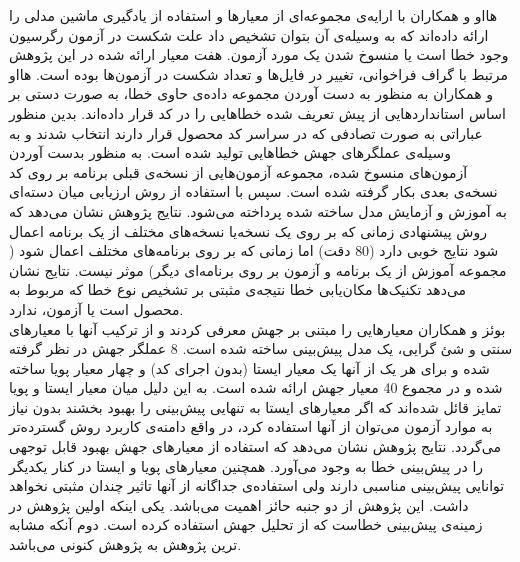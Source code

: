  هااو و همکاران با ارایه‌ی مجموعه‌ای از معیارها و استفاده از یادگیری ماشین مدلی را ارائه داده‌اند که به وسیله‌ی آن بتوان تشخیص داد علت شکست در آزمون رگرسیون وجود خطا است یا منسوخ  شدن یک مورد آزمون\cite{hao2013bug}. هفت معیار ارائه شده در این پژوهش مرتبط با گراف فراخوانی، تغییر در فایل‌ها و تعداد شکست در آزمون‌ها بوده است.  هااو و همکاران به منظور به دست آوردن مجموعه داده‌ی حاوی خطا، به صورت دستی بر اساس استانداردهایی  از پیش تعریف شده خطاهایی را در کد قرار داده‌اند. بدین منظور عباراتی به صورت تصادفی که در سراسر کد محصول قرار دارند انتخاب شدند و به وسیله‌ی عملگرهای جهش خطاهایی تولید شده است. به منظور بدست آوردن آزمون‌های منسوخ شده، مجموعه آزمون‌هایی از نسخه‌ی قبلی برنامه بر روی کد  نسخه‌ی بعدی بکار گرفته شده است. سپس با استفاده از روش ارزیابی میان دسته‌ای به آموزش و آزمایش مدل ساخته شده پرداخته می‌شود. نتایج پژوهش نشان می‌دهد که روش پیشنهادی زمانی که بر روی یک نسخه‌یا نسخه‌های مختلف از یک برنامه اعمال شود نتایج خوبی دارد (80\lr{\%} دقت) اما زمانی که بر روی برنامه‌های مختلف اعمال شود ( مجموعه آموزش از یک برنامه و آزمون بر روی برنامه‌ای دیگر) موثر نیست. نتایج نشان می‌دهد تکنیک‌ها مکان‌یابی خطا نتیجه‌ی مثبتی بر تشخیص نوع خطا که مربوط به محصول است یا آزمون، ندارد.\\
 
 بوئز و همکاران معیارهایی را مبتنی بر جهش معرفی کردند و  از ترکیب آنها با معیارهای سنتی و شئ گرایی، یک مدل پیش‌بینی ساخته شده است\cite{bowes2016mutation}. 8 عملگر جهش در نظر گرفته شده و برای هر یک از آنها یک معیار ایستا (بدون اجرای کد) و چهار معیار پویا ساخته شده و در مجموع 40 معیار جهش ارائه شده است. به این دلیل میان معیار ایستا و پویا تمایز قائل شده‌اند که اگر معیارهای ایستا به تنهایی  پیش‌بینی را بهبود بخشند بدون نیاز به موارد آزمون می‌توان از آنها استفاده کرد، در واقع دامنه‌ی کاربرد روش گسترده‌تر می‌گردد. نتایج پژوهش نشان می‌دهد که استفاده از معیارهای جهش بهبود قابل توجهی را در پیش‌بینی خطا به وجود می‌آورد. همچنین معیارهای پویا و ایستا در کنار یکدیگر توانایی پیش‌بینی مناسبی دارند ولی استفاده‌ی جداگانه از آنها تاثیر چندان مثبتی نخواهد داشت. این پژوهش از دو جنبه حائز اهمیت می‌باشد. یکی اینکه اولین پژوهش در زمینه‌ی پیش‌بینی خطاست که از تحلیل جهش استفاده کرده است. دوم آنکه مشابه ترین پژوهش به پژوهش کنونی می‌باشد. 
 
 
 
 
 
 
 
 
 
 
 
 
 
 
 
 
 
 
 
 
 

